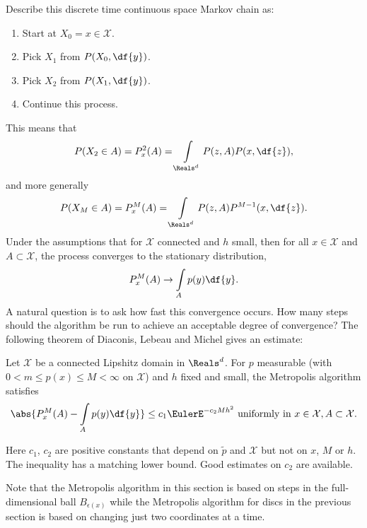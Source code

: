 \documentclass[12pt]{article}
\begin{document}
Describe this discrete time continuous space Markov chain as:
\begin{enumerate}
    \item
        Start at \( X_0 = x \in \mathcal{X} \).
    \item
        Pick \( X_1 \) from \( P(X_0, \df{y}) \).
    \item
        Pick \( X_2 \) from \( P(X_1, \df{y}) \).
    \item
        Continue this process.
\end{enumerate}
This means that
\[
    P(X_2 \in A) = P^2_x(A) = \int\limits_{\Reals^d} P(z,A) P(x,\df{z}),
\] and more generally
\[
    P(X_M \in A) = P^M_x(A) = \int\limits_{\Reals^d} P(z,A) P^{M-1}(x,\df
    {z}).
\] Under the assumptions that for \( \mathcal{X} \) connected and \( h \)
small, then for all \( x \in \mathcal{X} \) and \( A \subset \mathcal{X}
\), the process converges to the stationary distribution,
\[
    P^M_x(A) \to \int\limits_A p(y) \df{y}.
\] A natural question is to ask how fast this convergence occurs.  How
many steps should the algorithm be run to achieve an acceptable degree
of convergence?  The following theorem of Diaconis, Lebeau and Michel
gives an estimate:
\begin{theorem}
    Let \( \mathcal{X} \) be a connected Lipshitz domain in \( \Reals^d \).
    For \( p \) measurable (with \( 0 < m \le p(x) \le M < \infty \) on \(
    \mathcal{X} \)) and \( h \) fixed and small, the Metropolis
    algorithm satisfies
    \[
        \abs{P^M_x(A) - \int\limits_A p(y) \df{y} } \le c_1 \EulerE^{-c_2
        M h^2} \text{ uniformly in } x \in \mathcal{X}, A \subset
        \mathcal{X}.
    \]
\end{theorem}
Here \( c_1 \), \( c_2 \) are positive constants that depend on \(
\tilde{p} \) and \( \mathcal{X} \) but not on \( x \), \( M \) or \( h \).
The inequality has a matching lower bound.  Good estimates on \( c_2 \)
are available.

Note that the Metropolis algorithm in this section is based on steps in
the full-dimensional ball \( B_{\epsilon(x)} \) while the Metropolis
algorithm for discs in the previous section is based on changing just
two coordinates at a time.

\end{document}
